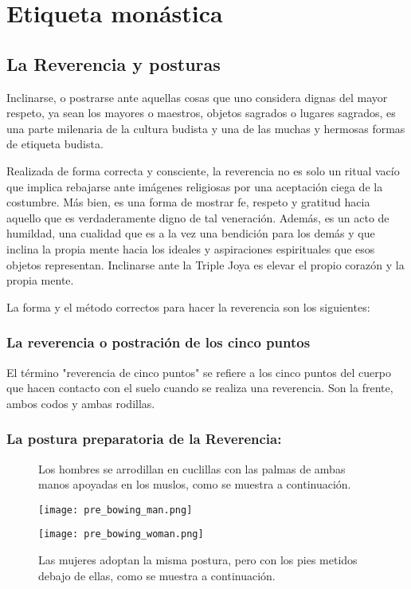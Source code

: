 \chapter{Etiqueta monástica}
\label{etiquette}

\section{La Reverencia y posturas}

Inclinarse, o postrarse ante aquellas cosas que uno considera dignas del mayor respeto, ya sean los mayores o maestros, objetos sagrados o lugares sagrados, es una parte milenaria de la cultura budista y una de las muchas y hermosas formas de etiqueta budista.

Realizada de forma correcta y consciente, la reverencia no es solo un ritual vacío que implica rebajarse ante imágenes religiosas por una aceptación ciega de la costumbre. Más bien, es una forma de mostrar fe, respeto y gratitud hacia aquello que es verdaderamente digno de tal veneración. Además, es un acto de humildad, una cualidad que es a la vez una bendición para los demás y que inclina la propia mente hacia los ideales y aspiraciones espirituales que esos objetos representan. Inclinarse ante la Triple Joya es elevar el propio corazón y la propia mente.

La forma y el método correctos para hacer la reverencia son los siguientes:

\subsection{La reverencia o postración de los cinco puntos}

El término "reverencia de cinco puntos" se refiere a los cinco puntos del cuerpo que hacen contacto con el suelo cuando se realiza una reverencia. Son la frente, ambos codos y ambas rodillas.

\captionsetup{font=small, labelformat=empty, position=above}

\subsection{La postura preparatoria de la Reverencia:}

\begin{figure}[h]
	\centering
	
	\begin{minipage}{0.49\textwidth}
		\centering
		\caption{Los hombres se arrodillan en cuclillas con las palmas de ambas manos apoyadas en los muslos, como se muestra a continuación.}
		\texttt{[image: pre\_bowing\_man.png]}
		
	\end{minipage}
	\hfill
	\begin{minipage}{0.49\textwidth}
		\centering
		\caption{Las mujeres adoptan la misma postura, pero con los pies metidos debajo de ellas, como se muestra a continuación.}
		\texttt{[image: pre\_bowing\_woman.png]}
		
	\end{minipage}
	
\end{figure}


